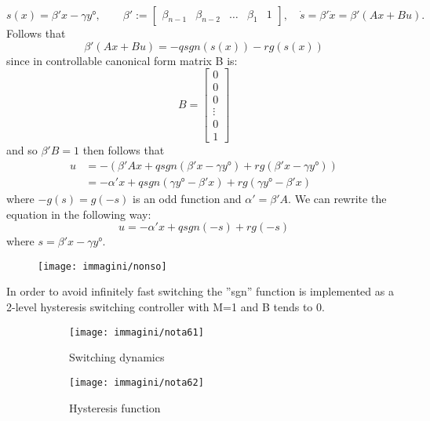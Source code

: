 \[s(x)=\beta'x-\gamma y°,\qquad \beta':=\begin{bmatrix}
	\beta_{n-1} & \beta_{n-2} & \dots & \beta_1 & 1
\end{bmatrix}, \quad \dot{s}=\beta'\dot{x}=\beta'(Ax+Bu).\] Follows that \[
\beta'(Ax+Bu)=-qsgn(s(x))-rg(s(x))
\] since in controllable canonical form matrix B is: 
\[B=\begin{bmatrix}
	0 \\ 0 \\ 0 \\ \vdots \\0 \\ 1
\end{bmatrix}
\] and so $\beta'B=1$ then follows that
\[\begin{aligned}
	u&=-(\beta'Ax+q sgn(\beta'x-\gamma y°)+rg(\beta'x-\gamma y°))\\
	&=-\alpha'x+q sgn(\gamma y°-\beta'x)+rg(\gamma y°-\beta'x)
\end{aligned}
\] where $-g(s)=g(-s) $ is an odd function and $\alpha'=\beta'A$. We can rewrite the equation in the following way:\[
u=-\alpha'x+qsgn(-s)+rg(-s)
\] where $s=\beta'x-\gamma y°$.
\begin{figure}[H]
	\centering
	\texttt{[image: immagini/nonso]}
	\caption{}
	\label{fig:nonso}
\end{figure}
\begin{note}
	In order to avoid infinitely fast switching the ''sgn'' function is implemented as a 2-level hysteresis switching controller with M=1 and B tends to 0.
	\begin{figure}[H]
		\centering
		\begin{subfigure}[b]{0.3\textwidth}
			\centering
			\texttt{[image: immagini/nota61]}
			\caption{Switching dynamics}
			\label{fig:nota61}
		\end{subfigure}
		\hfill
		\begin{subfigure}[b]{0.3\textwidth}
			\centering
			\texttt{[image: immagini/nota62]}
			\caption{Hysteresis function}
			\label{fig:hyste}
		\end{subfigure}
		\hfill
		\label{fig:notachap6}
		\caption[]{}
	\end{figure}
\end{note}
